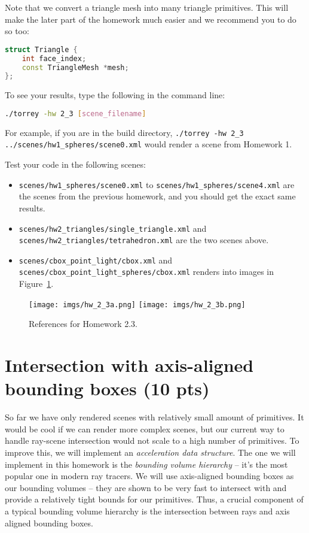 Note that we convert a triangle mesh into many triangle primitives. This will make the later part of the homework much easier and we recommend you to do so too:
\begin{lstlisting}[language=C++]
struct Triangle {
    int face_index;
    const TriangleMesh *mesh;
};
\end{lstlisting}

To see your results, type the following in the command line:
\begin{lstlisting}[language=bash]
./torrey -hw 2_3 [scene_filename]
\end{lstlisting}
For example, if you are in the build directory, \lstinline{./torrey -hw 2_3 ../scenes/hw1_spheres/scene0.xml} would render a scene from Homework 1.

Test your code in the following scenes: 
\begin{itemize}
  \item \lstinline{scenes/hw1_spheres/scene0.xml} to \lstinline{scenes/hw1_spheres/scene4.xml} are the scenes from the previous homework, and you should get the exact same results. 
  \item \lstinline{scenes/hw2_triangles/single_triangle.xml} and \lstinline{scenes/hw2_triangles/tetrahedron.xml} are the two scenes above.
  \item \lstinline{scenes/cbox_point_light/cbox.xml} and \lstinline{scenes/cbox_point_light_spheres/cbox.xml} renders into images in Figure~\ref{fig:hw_2_3}.
\end{itemize}

\begin{figure}[ht]
    \centering
    \texttt{[image: imgs/hw\_2\_3a.png]}
    \texttt{[image: imgs/hw\_2\_3b.png]}
    \caption{References for Homework 2.3.}
    \label{fig:hw_2_3}
\end{figure}

\section{Intersection with axis-aligned bounding boxes (10 pts)}
So far we have only rendered scenes with relatively small amount of primitives. It would be cool if we can render more complex scenes, but our current way to handle ray-scene intersection would not scale to a high number of primitives. To improve this, we will implement an \emph{acceleration data structure}. The one we will implement in this homework is the \emph{bounding volume hierarchy} -- it's the most popular one in  modern ray tracers. We will use axis-aligned bounding boxes as our bounding volumes -- they are shown to be very fast to intersect with and provide a relatively tight bounds for our primitives. Thus, a crucial component of a typical bounding volume hierarchy is the intersection between rays and axis aligned bounding boxes. 

